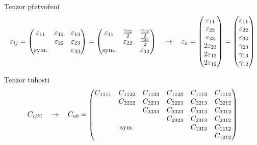 Tenzor přetvoření
\begin{equation*}
	\varepsilon_{ij} =
	\begin{pmatrix}
		\varepsilon_{11} & \varepsilon_{12} & \varepsilon_{13} \\ & \varepsilon_{22} & \varepsilon_{23} \\ \text{\small sym.} & & \varepsilon_{33} \\
	\end{pmatrix} =
	\begin{pmatrix}
		\varepsilon_{11} & \frac{\gamma_{12}}{2} & \frac{\gamma_{13}}{2} \\ & \varepsilon_{22} & \frac{\gamma_{23}}{2} \\ \text{\small sym.} & & \varepsilon_{33} \\
	\end{pmatrix}
	\quad\rightarrow\quad
	\varepsilon_{a} =
	\begin{pmatrix}
		\varepsilon_{11} \\ \varepsilon_{22} \\ \varepsilon_{33} \\ 2 \varepsilon_{23} \\ 2 \varepsilon_{13} \\ 2 \varepsilon_{12} \\
	\end{pmatrix} =
	\begin{pmatrix}
		\varepsilon_{11} \\ \varepsilon_{22} \\ \varepsilon_{33} \\ \gamma_{23} \\ \gamma_{13} \\ \gamma_{12} \\
	\end{pmatrix}
\end{equation*}

Tenzor tuhosti
\begin{equation*}
	C_{ijkl}
	\quad\rightarrow\quad
	C_{ab} =
	\begin{pmatrix}
	C_{1111} & C_{1122} & C_{1133} & C_{1123} & C_{1113} & C_{1112} \\
	         & C_{2222} & C_{2233} & C_{2223} & C_{2213} & C_{2212} \\
	         &          & C_{3333} & C_{3323} & C_{3313} & C_{3312} \\
	         &          &          & C_{2323} & C_{2313} & C_{2312} \\
	      & \text{\small sym.} &          &          & C_{1313} & C_{1112} \\
	         &          &          &          &          & C_{1212} \\
	\end{pmatrix}
\end{equation*}


